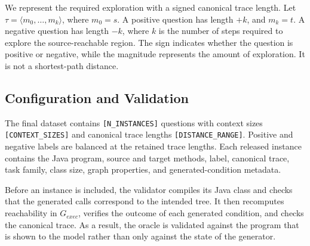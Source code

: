 We represent the required exploration with a signed canonical trace length. Let $\tau=\langle m_0,\ldots,m_k\rangle$, where $m_0=s$. A positive question has length $+k$, and $m_k=t$. A negative question has length $-k$, where $k$ is the number of steps required to explore the source-reachable region. The sign indicates whether the question is positive or negative, while the magnitude represents the amount of exploration. It is not a shortest-path distance.

\subsection{Configuration and Validation}

The final dataset contains \texttt{[N\_INSTANCES]} questions with context sizes \texttt{[CONTEXT\_SIZES]} and canonical trace lengths \texttt{[DISTANCE\_RANGE]}. Positive and negative labels are balanced at the retained trace lengths. Each released instance contains the Java program, source and target methods, label, canonical trace, task family, class size, graph properties, and generated-condition metadata.

Before an instance is included, the validator compiles its Java class and checks that the generated calls correspond to the intended tree. It then recomputes reachability in $G_{\mathit{exec}}$, verifies the outcome of each generated condition, and checks the canonical trace. As a result, the oracle is validated against the program that is shown to the model rather than only against the state of the generator.
